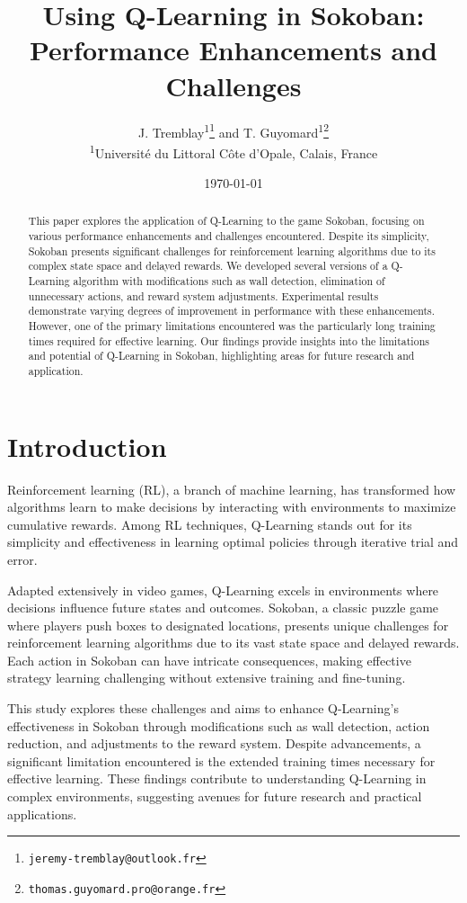 \documentclass[10pt,twocolumn]{article}
\title{Using Q-Learning in Sokoban: Performance Enhancements and Challenges}
\author{
  J. Tremblay\textsuperscript{1}\thanks{\texttt{jeremy-tremblay@outlook.fr}}  
  \space and T. Guyomard\textsuperscript{1}\thanks{\texttt{thomas.guyomard.pro@orange.fr}} \\
  \textsuperscript{1}Université du Littoral Côte d'Opale, Calais, France
}
\date{\today}
\begin{document}
\maketitle

\begin{abstract}
    This paper explores the application of Q-Learning to the game Sokoban, focusing on various performance enhancements and challenges encountered. Despite its simplicity, Sokoban presents significant challenges for reinforcement learning algorithms due to its complex state space and delayed rewards. We developed several versions of a Q-Learning algorithm with modifications such as wall detection, elimination of unnecessary actions, and reward system adjustments. Experimental results demonstrate varying degrees of improvement in performance with these enhancements. However, one of the primary limitations encountered was the particularly long training times required for effective learning. Our findings provide insights into the limitations and potential of Q-Learning in Sokoban, highlighting areas for future research and application.
\end{abstract}

\section{Introduction}

Reinforcement learning (RL), a branch of machine learning, has transformed how algorithms learn to make decisions by interacting with environments to maximize cumulative rewards. Among RL techniques, Q-Learning stands out for its simplicity and effectiveness in learning optimal policies through iterative trial and error.

Adapted extensively in video games, Q-Learning excels in environments where decisions influence future states and outcomes. Sokoban, a classic puzzle game where players push boxes to designated locations, presents unique challenges for reinforcement learning algorithms due to its vast state space and delayed rewards. Each action in Sokoban can have intricate consequences, making effective strategy learning challenging without extensive training and fine-tuning.

This study explores these challenges and aims to enhance Q-Learning's effectiveness in Sokoban through modifications such as wall detection, action reduction, and adjustments to the reward system. Despite advancements, a significant limitation encountered is the extended training times necessary for effective learning. These findings contribute to understanding Q-Learning in complex environments, suggesting avenues for future research and practical applications.
\end{document}
